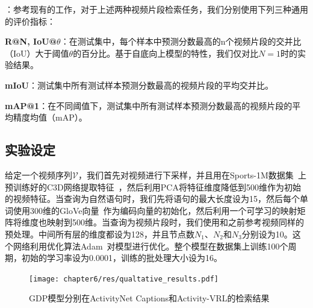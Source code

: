 \textbf{}：参考现有的工作，对于上述两种视频片段检索任务，我们分别使用下列三种通用的评价指标：

\textbf{R@N, IoU@$\theta$}：在测试集中，每个样本中预测分数最高的n个视频片段的交并比（IoU）大于阈值$\theta$的百分比。基于自底向上模型的特性，我们仅对比$N=1$时的实验结果。

\textbf{mIoU}：测试集中所有测试样本预测分数最高的视频片段的平均交并比。

\textbf{mAP@1}：在不同阈值下，测试集中所有测试样本预测分数最高的视频片段的平均精度均值（mAP）。


\subsection{实验设定}
给定一个视频序列$\mathcal{V}$，我们首先对视频进行下采样，并且用在Sports-1M数据集~\cite{karpathy2014large}上预训练好的C3D网络提取特征~\cite{tran2015learning}，然后利用PCA将特征维度降低到500维作为初始的视频特征。当查询为自然语句时，我们先将语句的最大长度设为15，然后每个单词使用300维的GloVe向量~\cite{pennington2014glove}作为编码向量的初始化，然后利用一个可学习的映射矩阵将维度也映射到500维。当查询为视频片段时，我们使用和之前参考视频同样的预处理。中间所有层的维度都设为128，并且节点数$N_1$、$N_2$和$N_3$分别设为10。这个网络利用优化算法Adam~\cite{kingma2015adam}对模型进行优化。整个模型在数据集上训练100个周期，初始的学习率设为0.0001，训练的批处理大小设为16。

\begin{figure}[t]
    \centering
    \texttt{[image: chapter6/res/qualtative\_results.pdf]}
    \caption{GDP模型分别在ActivityNet Captions和Activity-VRL的检索结果}
    \label{ch6:fig:qualtative_results}
\end{figure}


